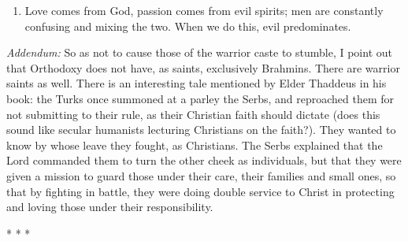 \begin{enumerate}
\begin{quotex}
\end{quotex}

\item Love comes from God, passion comes from evil spirits; men are constantly confusing and mixing the two. When we do this, evil predominates.

\end{enumerate}

\textit{Addendum:} So as not to cause those of the warrior caste to stumble, I point out that Orthodoxy does not have, as saints, exclusively Brahmins. There are warrior saints as well. There is an interesting tale mentioned by Elder Thaddeus in his book: the Turks once summoned at a parley the Serbs, and reproached them for not submitting to their rule, as their Christian faith should dictate (does this sound like secular humanists lecturing Christians on the faith?). They wanted to know by whose leave they fought, as Christians. The Serbs explained that the Lord commanded them to turn the other cheek as individuals, but that they were given a mission to guard those under their care, their families and small ones, so that by fighting in battle, they were doing double service to Christ in protecting and loving those under their responsibility.



\begin{center}* * *\end{center}

